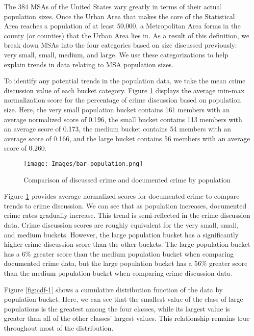 \documentclass[12pt,oneside, letterpaper]{book}
\begin{document}
\par The 384 MSAs of the United States vary greatly in terms of their actual population sizes. Once the Urban Area that makes the core of the Statistical Area reaches a population of at least 50,000, a Metropolitan Area forms in the county (or counties) that the Urban Area lies in. As a result of this definition, we break down MSAs into the four categories based on size discussed previously: very small, small, medium, and large. We use these categorizations to help explain trends in data relating to MSA population sizes.

\par To identify any potential trends in the population data, we take the mean crime discussion value of each bucket category. Figure \ref{fig:graph-1} displays the average min-max normalization score for the percentage of crime discussion based on population size. Here, the very small population bucket contains 161 members with an average normalized score of 0.196, the small bucket contains 113 members with an average score of 0.173, the medium bucket contains 54 members with an average score of 0.166, and the large bucket contains 56 members with an average score of 0.260.

\begin{figure}[ht]
    \centering
    \texttt{[image: Images/bar-population.png]}
    \caption{Comparison of discussed crime and documented crime by population}
    \label{fig:graph-1}
\end{figure}

\par Figure \ref{fig:graph-1} provides average normalized scores for documented crime to compare trends to crime discussion. We can see that as population increases, documented crime rates gradually increase. This trend is semi-reflected in the crime discussion data. Crime discussion scores are roughly equivalent for the very small, small, and medium buckets. However, the large population bucket has a significantly higher crime discussion score than the other buckets. The large population bucket has a 6\% greater score than the medium population bucket when comparing documented crime data, but the large population bucket has a 56\% greater score than the medium population bucket when comparing crime discussion data.

\par Figure \ref{fig:cdf-1} shows a cumulative distribution function of the data by population bucket. Here, we can see that the smallest value of the class of large populations is the greatest among the four classes, while its largest value is greater than all of the other classes' largest values. This relationship remains true throughout most of the distribution.
\end{document}

